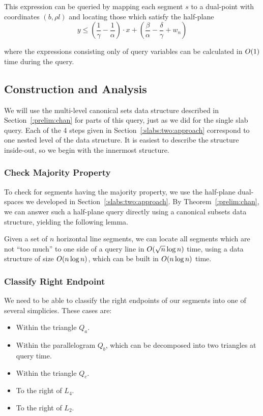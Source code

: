 This expression can be queried by mapping each segment $s$ to a dual-point with coordinates $(b, \rho l)$ and locating those which satisfy the half-plane
\[
y \leq \left ( \frac{1}{\gamma} - \frac{1}{\alpha} \right ) \cdot x + \left ( \frac{\beta}{\alpha} - \frac{\delta}{\gamma} + w_n \right )
\]

\noindent where the expressions consisting only of query variables can be calculated in $O\!\left(1\right)$ time during the query.


\subsection{Construction and Analysis}
\label{:slabs:two:analysis}

We will use the multi-level canonical sets data structure described in Section~\ref{:prelim:chan} for parts of this query, just as we did for the single slab query.  Each of the 4 steps given in Section~\ref{:slabs:two:approach} correspond to one nested level of the data structure.  It is easiest to describe the structure inside-out, so we begin with the innermost structure.


\subsubsection{Check Majority Property}

To check for segments having the majority property, we use the half-plane dual-spaces we developed in Section~\ref{:slabs:two:approach}. By Theorem~\ref{:prelim:chan}, we can answer such a half-plane query directly using a canonical subsets data structure, yielding the following lemma.

\begin{lemma}
\label{lem:slabs:two:step1}
Given a set of $n$ horizontal line segments, we can locate all segments which are not ``too much'' to one side of a query line in $O\!\left(\sqrt{n}\log{n}\right)$ time, using a data structure of size $O\!\left(n\log{n}\right)$, which can be built in $O\!\left(n\log{n}\right)$ time.
\end{lemma}


\subsubsection{Classify Right Endpoint}

We need to be able to classify the right endpoints of our segments into one of several simplicies. These cases are:
\begin{itemize}
 \item Within the triangle $Q_a$.
 \item Within the parallelogram $Q_b$, which can be decomposed into two triangles at query time.
 \item Within the triangle $Q_c$.
 \item To the right of $L_4$.
 \item To the right of $L_2$.
\end{itemize}

